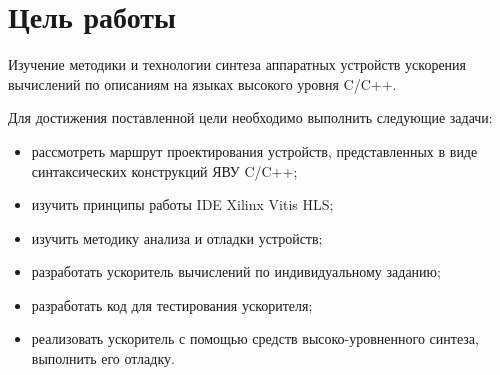 \setcounter{page}{2}
\chapter*{Цель работы}
Изучение методики и технологии синтеза аппаратных устройств ускорения вычислений по описаниям на языках высокого уровня C/C++. 

Для достижения поставленной цели необходимо выполнить следующие задачи:
\begin{itemize}
	\item рассмотреть маршрут проектирования устройств, представленных в виде синтаксических конструкций ЯВУ C/C++;
	\item изучить принципы работы IDE Xilinx Vitis HLS;
	\item изучить методику анализа и отладки устройств;
	\item разработать ускоритель вычислений по индивидуальному заданию;
	\item разработать код для тестирования ускорителя;
	\item реализовать ускоритель с помощью средств высоко-уровненного синтеза, выполнить его отладку.
\end{itemize}